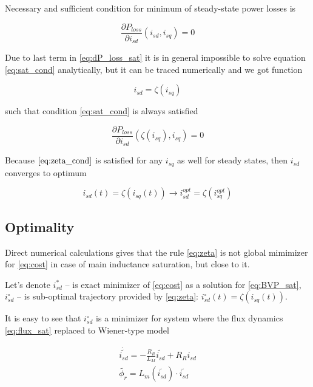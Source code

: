 \documentclass[journal]{IEEEtran}
\begin{document}
Necessary and sufficient condition for minimum of steady-state power losses is 

\begin{equation}\label{eq:sat_cond}
\frac{\partial P_{loss}}{\partial i_{sd}}(i_{sd}, i_{sq}) = 0
\end{equation}

Due to last term in \eqref{eq:dP_loss_sat} it is in general impossible to solve equation \eqref{eq:sat_cond} analytically, but it can be traced numerically and we got function

\begin{equation}
i_{sd} = \zeta(i_{sq})
\end{equation}

such that condition \eqref{eq:sat_cond} is always satisfied

\begin{equation}\label{eq:zeta_cond}
\frac{\partial P_{loss}}{\partial i_{sd}}(\zeta(i_{sq}), i_{sq}) = 0
\end{equation}

Because $\eqref{eq:zeta_cond}$ is satisfied for any $i_{sq}$ as well for steady states, then $i_{sd}$ converges to optimum

\begin{equation}\label{eq:zeta}
i_{sd}(t) = \zeta(i_{sq}(t)) \to i_{sd}^{opt} = \zeta(i_{sq}^{opt})
\end{equation}

\subsection{Optimality}

Direct numerical calculations gives that the rule \eqref{eq:zeta} is not global mimimizer for \eqref{eq:cost} in case of main inductance saturation, but close to it. 

Let's denote $i_{sd}^*$ -- is exact minimizer of \eqref{eq:cost} as a solution for \eqref{eq:BVP_sat}, $i_{sd}^\circ$ -- is sub-optimal trajectory provided by \eqref{eq:zeta}: $i_{sd}^\circ(t) = \zeta(i_{sq}(t))$.

It is easy to see that $i_{sd}^\circ$ is a minimizer for system where the flux dynamics \eqref{eq:flux_sat} replaced to Wiener-type model

\begin{equation}\label{eq:flux_approx}
\begin{gathered}
\dot {\widetilde{i_{sd}}} = -\frac{R_R}{L_M} \widetilde{i_{sd}} + R_R i_{sd} \\
\widetilde{\phi_r} = L_m(\widetilde{i_{sd}}) \cdot \widetilde{i_{sd}}
\end{gathered}
\end{equation}
\end{document}
